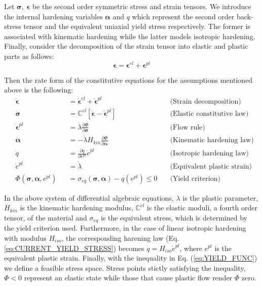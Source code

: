Let $\bm{\sigma},\ \bm{\epsilon}$ be the second order symmetric stress and 
strain tensors. We introduce the internal hardening variables $\bm{\alpha}$ and 
$q$ which represent the second order back-stress tensor and the equivalent 
uniaxial yield stress respectively. The former is associated with kinematic 
hardening while the latter models isotropic hardening. Finally, consider the 
decomposition of the strain tensor into elastic and plastic parts as follows:
\begin{equation}
	\bm{\epsilon} = \bm{\epsilon}^{el} + \bm{\epsilon}^{pl}
	\label{eq:DECOMP_STRAIN}
\end{equation} 

Then the rate form of the constitutive equations for the assumptions mentioned 
above is the following:
\begin{subequations}
	\begin{alignat}{3}
		&\dot{\bm{\epsilon}} &&= \dot{\bm{\epsilon}}^{el} +
		\dot{\bm{\epsilon}}^{pl}\quad& \text{(Strain 
		decomposition)}\label{eq:RATE_DECOMP}\\
		&\dot{\bm{\sigma}} &&= \mathbb{C}^{el}\left[\dot{\bm{\epsilon}} -
		\dot{\bm{\epsilon}}^{pl} \right]\quad& \text{(Elastic constitutive 
		law)}\label{eq:CONSTITUTIVE_LAW}\\
		&\dot{\bm{\epsilon}}^{pl} &&= \dot{\lambda}\frac{\partial \Phi}{\partial
			\bm{\sigma}}\quad& \text{(Flow rule)}\label{eq:FLOW_RULE}\\
		&\dot{\bm{\alpha}} &&= -\dot{\lambda}H_{kin}\frac{\partial 
		\Phi}{\partial
			\bm{\alpha}}\quad& \text{(Kinematic
			hardening law)}\label{eq:BACK_STRESS}\\
		&\dot{q} &&= \frac{\partial q}{\partial
			e^{pl}}\dot{e}^{pl}\quad& \text{(Isotropic hardening law)}
		\label{eq:CURRENT_YIELD_STRESS}\\
		&\dot{e}^{pl} &&= \dot{\lambda}\quad& \text{(Equivalent plastic 
		strain)}\label{eq:EQUIV_PLASTIC_STRAIN}\\
		&\Phi(\bm{\sigma},\bm{\alpha},e^{pl}) &&= 
		\sigma_{eq}(\bm{\sigma},\bm{\alpha}) - q(e^{pl}) \leq 0\quad&
		\text{(Yield criterion)}\label{eq:YIELD_FUNC} 
	\end{alignat}
	\label{eq:THREE_D_RATE}
\end{subequations}

In the above system of differential algebraic equations, $\lambda$ is the 
plastic
parameter, $H_{kin}$ is the kinematic hardening modulus, $\mathbb{C}^{el}$ is 
the elastic moduli, a fourth order tensor, of the material and $\sigma_{eq}$ is 
the equivalent stress, which is determined by the
yield criterion used. Furthermore, in the case of linear
isotropic hardening with modulus $H_{iso}$, the corresponding harening law (Eq. 
\ref{eq:CURRENT_YIELD_STRESS}) becomes $\dot{q} =
H_{iso}\dot{e}^{pl}$, where $e^{pl}$ is the equivalent plastic strain. Finally, 
with the inequality in Eq. (\ref{eq:YIELD_FUNC})
we define a feasible stress space. Stress points stictly satisfying the
inequality, $\Phi<0$ represent an elastic state while those that cause plastic 
flow
render $\Phi$ zero.

